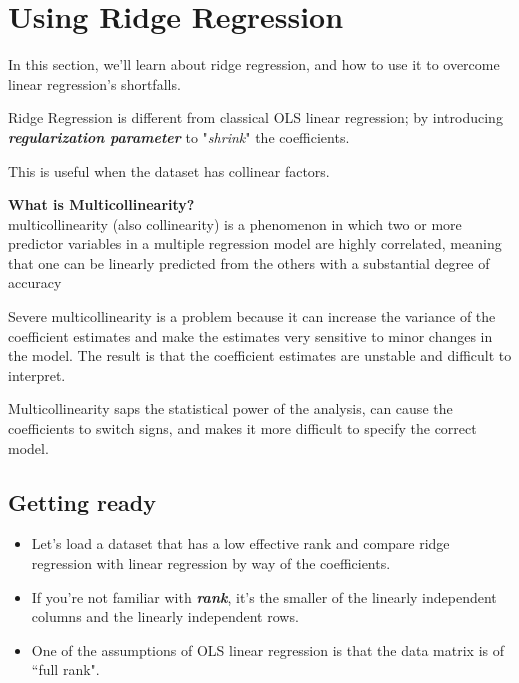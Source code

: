 \documentclass[SKL-MASTER.tex]{subfiles}
\begin{document}
\Large
\section*{Using Ridge Regression}

In this section, we'll learn about ridge regression, and how to use it to overcome linear
regression's shortfalls.

\begin{framed}
\noindent Ridge Regression is different from classical OLS linear regression;
by introducing \textbf{\textit{regularization parameter}} to "\textit{shrink}" the coefficients. 
\end{framed}

This is useful when the dataset has collinear factors.

\begin{framed}
\textbf{What is Multicollinearity?}\\
\noindent multicollinearity (also collinearity) is a phenomenon in which two or more predictor variables in a multiple regression model are highly correlated, meaning that one can be linearly predicted from the others with a substantial degree of accuracy
 
\noindent Severe multicollinearity is a problem because it can increase the variance of the coefficient estimates and make the estimates very sensitive to minor changes in the model. The result is that the coefficient estimates are unstable and difficult to interpret. 

Multicollinearity saps the statistical power of the analysis, can cause the coefficients to switch signs, and makes it more difficult to specify the correct model.
\end{framed}
\newpage

\subsection*{Getting ready}
\begin{itemize}
\item Let's load a dataset that has a low effective rank and compare ridge regression with linear
regression by way of the coefficients. 
\item If you're not familiar with \textbf{\textit{rank}}, it's the smaller of the
linearly independent columns and the linearly independent rows. 
\item One of the assumptions
of OLS linear regression is that the data matrix is of ``full rank".
\end{itemize}
\end{document}
